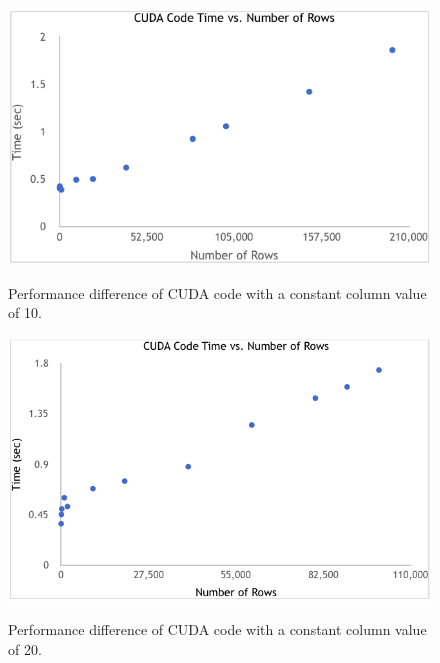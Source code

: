 \documentclass[letterpaper, 10 pt, conference]{ieeeconf}  %
\begin{document}
	\begin{figure}[thpb]
		\centering
		\includegraphics[width=\linewidth]{cudarow10.png}
		\label{fig:row10}
		\caption{Performance difference of CUDA code with a constant column value of 10.}
	\end{figure}

	\begin{figure}[thpb]
		\centering
		\includegraphics[width=\linewidth]{cudarow20.png}
		\label{fig:row20}
		\caption{Performance difference of CUDA code with a constant column value of 20.}
	\end{figure}	


\addtolength{\textheight}{-12cm}   %
\end{document}
